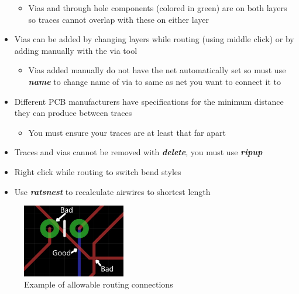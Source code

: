 \documentclass{article}
\begin{document}
\begin{itemize}
\begin{itemize}
        \item Vias and through hole components (colored in green) are on both layers so traces cannot overlap with these on either layer
    \end{itemize}
    \item Vias can be added by changing layers while routing (using middle click) or by adding manually with the via tool
    \begin{itemize}
        \item Vias added manually do not have the net automatically set so must use \textit{\textbf{name}} to change name of via to same as net you want to connect it to
    \end{itemize}
    \item Different PCB manufacturers have specifications for the minimum distance they can produce between traces
    \begin{itemize}
        \item You must ensure your traces are at least that far apart
    \end{itemize}
    \item Traces and vias cannot be removed with \textit{\textbf{delete}}, you must use \textit{\textbf{ripup}}
\end{itemize}
\begin{tcolorbox} [title=Tips \& Tricks]
    \begin{itemize}
        \item Right click while routing to switch bend styles
        \item Use \textit{\textbf{ratsnest}} to recalculate airwires to shortest
        length
    \end{itemize}
\end{tcolorbox}

\begin{figure}[!h]
    \center
    \includegraphics[width=0.4\textwidth,height=0.4\textheight,keepaspectratio]{routing}
    \caption {Example of allowable routing connections}
    \label{img:routing}
\end{figure}
\end{document}
